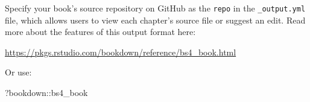 \documentclass[
]{book}
\newenvironment{Shaded}{\begin{snugshade}}{\end{snugshade}}
\newcommand{\NormalTok}[1]{#1}
\newcommand{\SpecialCharTok}[1]{\textcolor[rgb]{0.00,0.00,0.00}{#1}}
\theoremstyle{definition}
\theoremstyle{definition}
\theoremstyle{definition}
\theoremstyle{definition}
\theoremstyle{remark}
\begin{document}
Specify your book's source repository on GitHub as the \texttt{repo} in the \texttt{\_output.yml} file, which allows users to view each chapter's source file or suggest an edit. Read more about the features of this output format here:

\url{https://pkgs.rstudio.com/bookdown/reference/bs4_book.html}

Or use:

\begin{Shaded}
\begin{Highlighting}[]
\NormalTok{?bookdown}\SpecialCharTok{::}\NormalTok{bs4\_book}
\end{Highlighting}
\end{Shaded}


  
\end{document}
